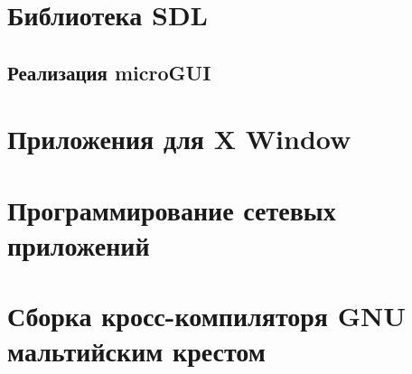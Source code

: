 \chapter{Библиотека SDL}

\section{Реализация microGUI}

\chapter{Приложения для X Window}

\chapter{Программирование сетевых приложений}

\chapter{Сборка кросс-компиляторя GNU мальтийским крестом}









\printbibliography



